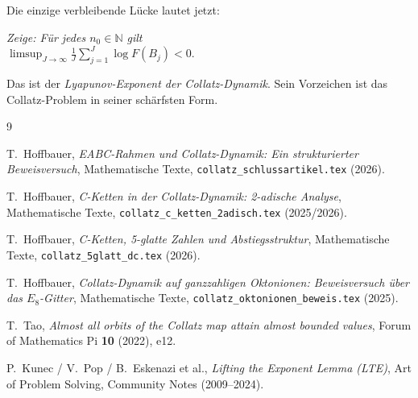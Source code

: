 \documentclass[12pt,a4paper]{article}
\newcommand{\N}{\mathbb{N}}
\begin{document}
\begin{tcolorbox}[lücke, title={Präzise verbleibende Lücke}]
Die einzige verbleibende Lücke lautet jetzt:

\medskip
\begin{center}
\textit{Zeige: Für jedes $n_0 \in \N$ gilt\\[6pt]
$\displaystyle\limsup_{J\to\infty}\frac{1}{J}\sum_{j=1}^{J}\log F(B_j) < 0.$}
\end{center}

\medskip
Das ist der \emph{Lyapunov-Exponent der Collatz-Dynamik}.
Sein Vorzeichen ist das Collatz-Problem in seiner schärfsten Form.
\end{tcolorbox}

\begin{thebibliography}{9}

T.\ Hoffbauer,
\textit{EABC-Rahmen und Collatz-Dynamik: Ein strukturierter Beweisversuch},
Mathematische Texte, \texttt{collatz\_schlussartikel.tex} (2026).

T.\ Hoffbauer,
\textit{C-Ketten in der Collatz-Dynamik: 2-adische Analyse},
Mathematische Texte, \texttt{collatz\_c\_ketten\_2adisch.tex} (2025/2026).

T.\ Hoffbauer,
\textit{C-Ketten, 5-glatte Zahlen und Abstiegsstruktur},
Mathematische Texte, \texttt{collatz\_5glatt\_dc.tex} (2026).

T.\ Hoffbauer,
\textit{Collatz-Dynamik auf ganzzahligen Oktonionen: Beweisversuch über das $E_8$-Gitter},
Mathematische Texte, \texttt{collatz\_oktonionen\_beweis.tex} (2025).

T.\ Tao,
\textit{Almost all orbits of the Collatz map attain almost bounded values},
Forum of Mathematics Pi \textbf{10} (2022), e12.

P.\ Kunec / V.\ Pop / B.\ Eskenazi et al.,
\textit{Lifting the Exponent Lemma (LTE)},
Art of Problem Solving, Community Notes (2009--2024).

\end{thebibliography}
\end{document}
